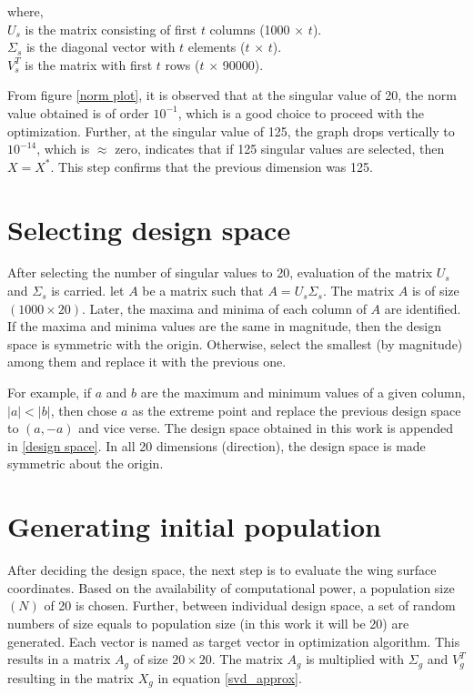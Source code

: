 where,\\
$U_s$ is the matrix consisting of first $t$ columns (1000 $\times$ $t$).\\
$\Sigma_s$ is the diagonal vector with $t$ elements ($t$ $\times$ $t$).\\
$V^T_s$ is the matrix with first $t$ rows ($t$ $\times$ 90000).

From figure \ref{norm plot}, it is observed that at the singular value of 20, the norm value obtained is of order $10^{-1}$, which is a good choice to proceed with the optimization. Further, at the singular value of 125, the graph drops vertically to $10^{-14}$, which is $\approx$ zero, indicates that if 125 singular values are selected, then $X=X^*$. This step confirms that the previous dimension was 125.

\section{Selecting design space}
After selecting the number of singular values to 20, evaluation of the matrix $U_s$ and $\Sigma_s$ is carried. let $A$ be a matrix such that $A = U_s \Sigma_s$. The matrix $A$ is of size $(1000 \times 20)$. Later, the maxima and minima of each column of $A$ are identified. If the maxima and minima values are the same in magnitude, then the design space is symmetric with the origin. Otherwise, select the smallest (by magnitude) among them and replace it with the previous one.

For example, if $a$ and $b$ are the maximum and minimum values of a given column, $|a|<|b|$, then chose $a$ as the extreme point and replace the previous design space to $(a, -a)$ and vice verse. The design space obtained in this work is appended in \ref{design space}. In all 20 dimensions (direction), the design space is made symmetric about the origin.

\section{Generating initial population}
After deciding the design space, the next step is to evaluate the wing surface coordinates. Based on the availability of computational power, a population size $(N)$ of 20 is chosen. Further, between individual design space, a set of random numbers of size equals to population size (in this work it will be 20) are generated. Each vector is named as target vector in optimization algorithm. This results in a matrix $A_g$ of size $20 \times 20$. The matrix $A_g$ is multiplied with $\Sigma_g$ and $V^T_g$ resulting in the matrix $X_g$ in equation \ref{svd_approx}.

